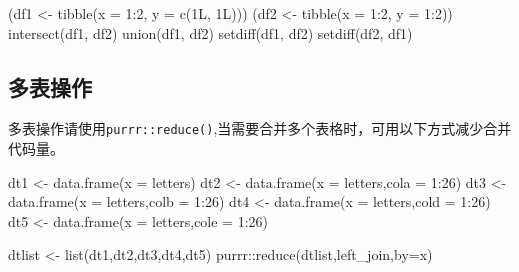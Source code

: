 \documentclass[
]{book}
\newenvironment{Shaded}{\begin{snugshade}}{\end{snugshade}}
\newcommand{\AttributeTok}[1]{\textcolor[rgb]{0.77,0.63,0.00}{#1}}
\newcommand{\DecValTok}[1]{\textcolor[rgb]{0.00,0.00,0.81}{#1}}
\newcommand{\FunctionTok}[1]{\textcolor[rgb]{0.00,0.00,0.00}{#1}}
\newcommand{\NormalTok}[1]{#1}
\newcommand{\OtherTok}[1]{\textcolor[rgb]{0.56,0.35,0.01}{#1}}
\newcommand{\SpecialCharTok}[1]{\textcolor[rgb]{0.00,0.00,0.00}{#1}}
\newcommand{\StringTok}[1]{\textcolor[rgb]{0.31,0.60,0.02}{#1}}
\begin{document}
\begin{Shaded}
\begin{Highlighting}[]
\NormalTok{(df1 }\OtherTok{\textless{}{-}} \FunctionTok{tibble}\NormalTok{(}\AttributeTok{x =} \DecValTok{1}\SpecialCharTok{:}\DecValTok{2}\NormalTok{, }\AttributeTok{y =} \FunctionTok{c}\NormalTok{(1L, 1L)))}
\NormalTok{(df2 }\OtherTok{\textless{}{-}} \FunctionTok{tibble}\NormalTok{(}\AttributeTok{x =} \DecValTok{1}\SpecialCharTok{:}\DecValTok{2}\NormalTok{, }\AttributeTok{y =} \DecValTok{1}\SpecialCharTok{:}\DecValTok{2}\NormalTok{))}
\FunctionTok{intersect}\NormalTok{(df1, df2)}
\FunctionTok{union}\NormalTok{(df1, df2)}
\FunctionTok{setdiff}\NormalTok{(df1, df2)}
\FunctionTok{setdiff}\NormalTok{(df2, df1)}
\end{Highlighting}
\end{Shaded}

\hypertarget{ux591aux8868ux64cdux4f5c}{%
\subsection{多表操作}\label{ux591aux8868ux64cdux4f5c}}

多表操作请使用\texttt{purrr::reduce()},当需要合并多个表格时，可用以下方式减少合并代码量。

\begin{Shaded}
\begin{Highlighting}[]
\NormalTok{dt1 }\OtherTok{\textless{}{-}} \FunctionTok{data.frame}\NormalTok{(}\AttributeTok{x =}\NormalTok{ letters)}
\NormalTok{dt2 }\OtherTok{\textless{}{-}} \FunctionTok{data.frame}\NormalTok{(}\AttributeTok{x =}\NormalTok{ letters,}\AttributeTok{cola =} \DecValTok{1}\SpecialCharTok{:}\DecValTok{26}\NormalTok{)}
\NormalTok{dt3 }\OtherTok{\textless{}{-}} \FunctionTok{data.frame}\NormalTok{(}\AttributeTok{x =}\NormalTok{ letters,}\AttributeTok{colb =} \DecValTok{1}\SpecialCharTok{:}\DecValTok{26}\NormalTok{)}
\NormalTok{dt4 }\OtherTok{\textless{}{-}} \FunctionTok{data.frame}\NormalTok{(}\AttributeTok{x =}\NormalTok{ letters,}\AttributeTok{cold =} \DecValTok{1}\SpecialCharTok{:}\DecValTok{26}\NormalTok{)}
\NormalTok{dt5 }\OtherTok{\textless{}{-}} \FunctionTok{data.frame}\NormalTok{(}\AttributeTok{x =}\NormalTok{ letters,}\AttributeTok{cole =} \DecValTok{1}\SpecialCharTok{:}\DecValTok{26}\NormalTok{)}

\NormalTok{dtlist }\OtherTok{\textless{}{-}} \FunctionTok{list}\NormalTok{(dt1,dt2,dt3,dt4,dt5)}
\NormalTok{purrr}\SpecialCharTok{::}\FunctionTok{reduce}\NormalTok{(dtlist,left\_join,}\AttributeTok{by=}\StringTok{\textquotesingle{}x\textquotesingle{}}\NormalTok{)}
\end{Highlighting}
\end{Shaded}
\end{document}
